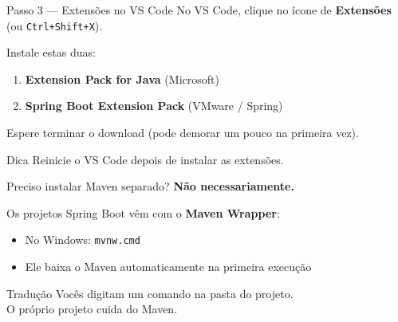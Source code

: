 \documentclass[aspectratio=169,11pt]{beamer}
\begin{document}
\begin{frame}{Passo 3 --- Extensões no VS Code}
  No VS Code, clique no ícone de \textbf{Extensões} (ou \texttt{Ctrl+Shift+X}).

  \vspace{0.5em}
  Instale estas duas:

  \begin{enumerate}
    \item \textbf{Extension Pack for Java} (Microsoft)
    \item \textbf{Spring Boot Extension Pack} (VMware / Spring)
  \end{enumerate}

  \vspace{0.6em}
  Espere terminar o download (pode demorar um pouco na primeira vez).

  \vspace{0.4em}
  \begin{alertblock}{Dica}
    Reinicie o VS Code depois de instalar as extensões.
  \end{alertblock}
\end{frame}

\begin{frame}{Preciso instalar Maven separado?}
  \textbf{Não necessariamente.}

  \vspace{0.5em}
  Os projetos Spring Boot vêm com o \textbf{Maven Wrapper}:

  \begin{itemize}
    \item No Windows: \texttt{mvnw.cmd}
    \item Ele baixa o Maven automaticamente na primeira execução
  \end{itemize}

  \vspace{0.6em}
  \begin{block}{Tradução}
    Vocês digitam um comando na pasta do projeto.\\
    O próprio projeto cuida do Maven.
  \end{block}
\end{frame}
\end{document}
